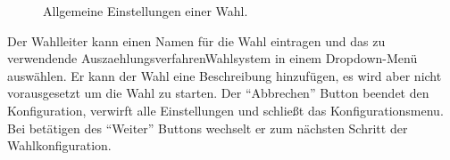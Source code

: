 \documentclass[parskip=full,11pt,twoside]{scrartcl}
\begin{document}
\begin{figure}[H]
	\caption{\label{fig:wlltr-general}
		Allgemeine Einstellungen einer \gls{Wahl}.
	}
\end{figure}
Der \gls{Wahlleiter} kann einen Namen für die \gls{Wahl} eintragen und das zu verwendende \gls{Auszaehlungsverfahren}{Wahlsystem} in einem Dropdown-Menü auswählen.
Er kann der \gls{Wahl} eine Beschreibung hinzufügen, es wird aber nicht vorausgesetzt um die Wahl zu starten.
Der \enquote{Abbrechen} Button beendet den Konfiguration, verwirft alle Einstellungen und schließt das \gls{Konfigurationsmenu}.
Bei betätigen des \enquote{Weiter} Buttons wechselt er zum nächsten Schritt der Wahlkonfiguration.
\end{document}
